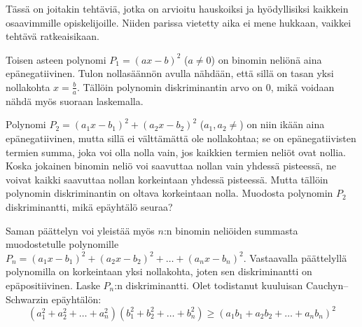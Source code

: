 Tässä on joitakin tehtäviä, jotka on arvioitu hauskoiksi ja hyödyllisiksi kaikkein osaavimmille opiskelijoille. Niiden parissa vietetty aika ei mene hukkaan, vaikkei tehtävä ratkeaisikaan.

\begin{tehtava}
\end{tehtava}

\begin{tehtava} %
Toisen asteen polynomi $P_1 = (ax-b)^2$ ($a \neq 0 $) on binomin neliönä aina epänegatiivinen. Tulon nollasäännön avulla nähdään, että sillä on tasan yksi nollakohta $x = \frac{b}{a}$. Tällöin polynomin diskriminantin arvo on 0, mikä voidaan nähdä myös suoraan laskemalla.

Polynomi $P_2 = (a_1x-b_1)^2+(a_2x-b_2)^2$ ($a_1,a_2 \neq $) on niin ikään aina epänegatiivinen, mutta sillä ei välttämättä ole nollakohtaa; se on epänegatiivisten termien summa, joka voi olla nolla vain, jos kaikkien termien neliöt ovat nollia. Koska jokainen binomin neliö voi saavuttaa nollan vain yhdessä pisteessä, ne voivat kaikki saavuttaa nollan korkeintaan yhdessä pisteessä. Mutta tällöin polynomin diskriminantin on oltava korkeintaan nolla. Muodosta polynomin $P_2$ diskriminantti, mikä epäyhtälö seuraa?

Saman päättelyn voi yleistää myös $n$:n binomin neliöiden summasta muodostetulle polynomille $P_n = (a_1x-b_1)^2+(a_2x-b_2)^2+\ldots+(a_nx-b_n)^2$. Vastaavalla päättelyllä polynomilla on korkeintaan yksi nollakohta, joten sen diskriminantti on epäpositiivinen. Laske $P_n$:n diskriminantti. Olet todistanut kuuluisan Cauchyn--Schwarzin epäyhtälön:
\[
(a_1^2+a_2^2+\ldots+a_n^2)(b_1^2+b_2^2+\ldots+b_n^2) \geq (a_1b_1+a_2b_2+\ldots+a_nb_n)^2
\]

\end{tehtava}